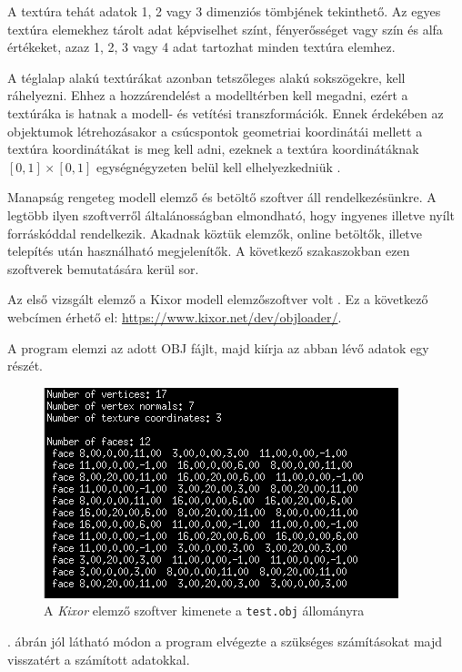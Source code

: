 A textúra tehát adatok 1, 2 vagy 3 dimenziós tömbjének tekinthető. Az egyes textúra elemekhez tárolt adat képviselhet színt, fényerősséget vagy szín és alfa értékeket, azaz 1, 2, 3 vagy 4 adat  tartozhat minden textúra elemhez.

A téglalap alakú textúrákat azonban tetszőleges alakú sokszögekre, kell ráhelyezni. Ehhez a hozzárendelést a modelltérben kell megadni, ezért  a textúráka is hatnak a modell- és vetítési transzformációk. Ennek érdekében az objektumok létrehozásakor a csúcspontok geometriai koordinátái mellett a textúra koordinátákat is meg kell adni, ezeknek a textúra koordinátáknak $[0, 1] \times [0, 1]$ egységnégyzeten belül kell elhelyezkedniük \cite{juhasz2003opengl}.


Manapság rengeteg modell elemző és betöltő szoftver áll rendelkezésünkre. A legtöbb ilyen szoftverről általánosságban elmondható, hogy ingyenes illetve  nyílt forráskóddal rendelkezik. Akadnak köztük elemzők, online betöltők, illetve telepítés után használható megjelenítők. A következő szakaszokban ezen szoftverek bemutatására kerül sor.


Az első vizsgált elemző a Kixor modell elemzőszoftver volt \cite{micah1987markup}.
Ez a következő webcímen érhető el: \url{https://www.kixor.net/dev/objloader/}.

A program elemzi az adott OBJ fájlt, majd kiírja az abban lévő adatok egy részét.

\begin{figure}[h]
\centering
\includegraphics[scale=0.8]{images/kixor.png}
\caption{A \textit{Kixor} elemző szoftver kimenete a \texttt{test.obj} állományra}
\label{fig:kixor}
\end{figure}
\bigskip

. ábrán jól látható módon a program elvégezte a szükséges számításokat majd visszatért a számított adatokkal.


